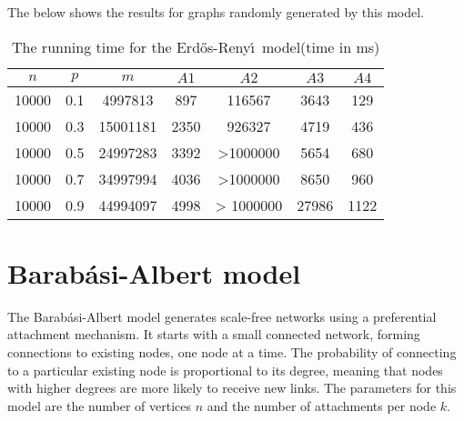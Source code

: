 The  below shows the results for graphs randomly generated by this model. 
\begin{center}
\begin{table}[]
    \centering
    \begin{tabular}[
    caption = {Erdos-Renyi model},
    label = {tbl:erdos_renyi},
  ]{ | c | c | c | c | c | c | c | }
  \hline
     $n$ & $p$ & $m$ & $A1$ & $A2$ & $A3$ & $A4$ \\ [0.5ex] 
  \hline\hline
   10000 & 0.1 & 4997813 & 897 & 116567 & 3643 & 129 \\
  \hline
 10000 & 0.3 & 15001181 & 2350 & 926327 & 4719 & 436 \\
\hline
 10000 & 0.5 & 24997283 & 3392 & >1000000 & 5654 & 680 \\
\hline
 10000 & 0.7 & 34997994 & 4036 & >1000000 & 8650 & 960 \\
\hline
 10000 & 0.9 & 44994097 & 4998 & > 1000000 & 27986 & 1122 \\
  \hline
  \end{tabular}
  \caption{The running time for the Erd\H{o}s-Reny\'\i\ model(time in ms)}
    \label{tab:erdos_renyi}
\end{table}
\end{center}
\section{Barab\'asi-Albert model}
The Barab\'asi-Albert model generates scale-free networks using a preferential attachment mechanism. It starts with a small connected network, forming connections to existing nodes, one node at a time. The probability of connecting to a particular existing node is proportional to its degree, meaning that nodes with higher degrees are more likely to receive new links. The parameters for this model are the number of vertices $n$ and the number of attachments per node $k$.

